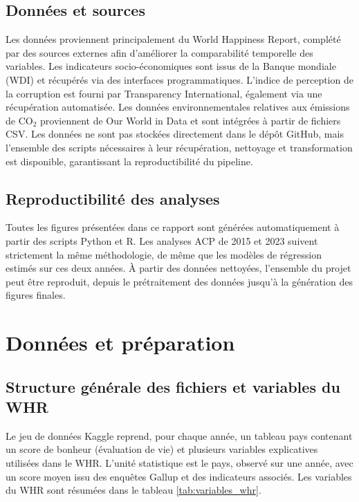 \documentclass{article}
\begin{document}
\subsection{Données et sources}

Les données proviennent principalement du World Happiness Report, complété par des sources externes afin d’améliorer la comparabilité temporelle des variables.
Les indicateurs socio-économiques sont issus de la Banque mondiale (WDI) et récupérés via des interfaces programmatiques.
L’indice de perception de la corruption est fourni par Transparency International, également via une récupération automatisée.
Les données environnementales relatives aux émissions de CO$_2$ proviennent de Our World in Data et sont intégrées à partir de fichiers CSV.
Les données ne sont pas stockées directement dans le dépôt GitHub, mais l’ensemble des scripts nécessaires à leur récupération, nettoyage et transformation est disponible, garantissant la reproductibilité du pipeline.

\subsection{Reproductibilité des analyses}

Toutes les figures présentées dans ce rapport sont générées automatiquement à partir des scripts Python et R.
Les analyses ACP de 2015 et 2023 suivent strictement la même méthodologie, de même que les modèles de régression estimés sur ces deux années.
À partir des données nettoyées, l’ensemble du projet peut être reproduit, depuis le prétraitement des données jusqu’à la génération des figures finales.

\newpage

\section{Données et préparation}

\subsection{Structure générale des fichiers et variables du WHR}

Le jeu de données Kaggle reprend, pour chaque année, un tableau pays contenant un score de bonheur (évaluation de vie) et plusieurs variables explicatives utilisées dans le WHR. L’unité statistique est le pays, observé sur une année, avec un score moyen issu des enquêtes Gallup et des indicateurs associés.
Les variables du WHR sont résumées dans le tableau \ref{tab:variables_whr}.
\end{document}
